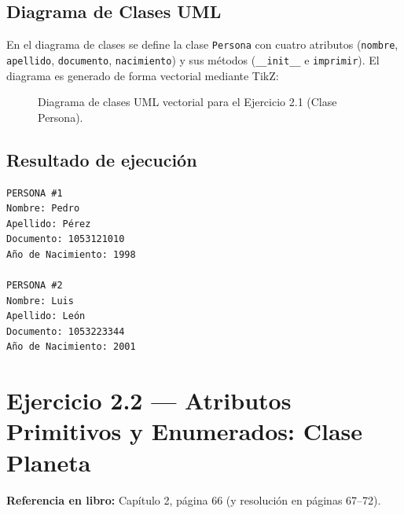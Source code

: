 \documentclass[11pt,a4paper]{article}
\newcommand{\umlm}{$-$\,}
\newcommand{\umlp}{$+$\,}
\begin{document}
\subsection{Diagrama de Clases UML}
En el diagrama de clases se define la clase \texttt{Persona} con cuatro atributos (\texttt{nombre}, \texttt{apellido}, \texttt{documento}, \texttt{nacimiento}) y sus métodos (\texttt{\_\_init\_\_} e \texttt{imprimir}). El diagrama es generado de forma vectorial mediante TikZ:

\begin{figure}[H]
    \centering
    \caption{Diagrama de clases UML vectorial para el Ejercicio 2.1 (Clase Persona).}
    \label{fig:uml_ej2_1}
\end{figure}

\subsection{Resultado de ejecución}
\begin{verbatim}
PERSONA #1
Nombre: Pedro
Apellido: Pérez
Documento: 1053121010
Año de Nacimiento: 1998

PERSONA #2
Nombre: Luis
Apellido: León
Documento: 1053223344
Año de Nacimiento: 2001
\end{verbatim}

\newpage

\section{Ejercicio 2.2 — Atributos Primitivos y Enumerados: Clase Planeta}
\textbf{Referencia en libro:} Capítulo 2, página 66 (y resolución en páginas 67--72).
\end{document}
